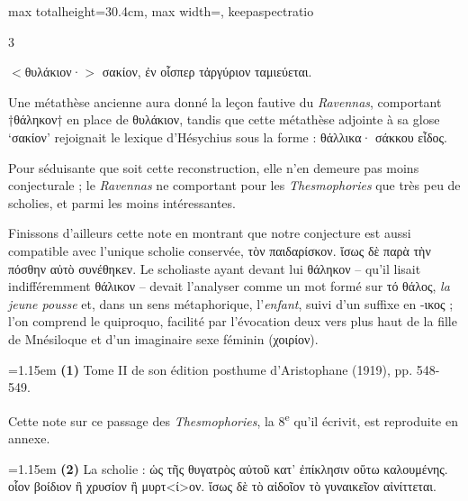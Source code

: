 \documentclass[11pt,twoside]{book}
\newcommand{\italique}[1]{\textit{#1}}
\newcommand{\citComm}[1]{\begin{quoting}[vskip=0.4pt,leftmargin=0.7em,rightmargin=0.2em]#1\end{quoting}}
\newcommand{\nieme}[1]{#1\textsuperscript{e}}
\begin{document}
\begin{adjustbox}{max totalheight=30.4cm, max width=\textwidth, keepaspectratio}
\begin{minipage}{\textwidth}
{\begin{multicols}{3}
\citComm{$<$θυλάκιον·$>$ σακίον, ἐν οἷσπερ τἀργύριον ταμιεύεται.}
\par\vspace{1.5pt}
\noindent Une métathèse ancienne aura donné la leçon fautive du \italique{Ravennas}, comportant †θάληκον† en place de θυλάκιον, tandis que cette métathèse adjointe à sa glose `σακίον' rejoignait le lexique d'Hésychius sous la forme : θάλλικα· σάκκου εἶδος.
\par\vspace{1.5pt}
\noindent Pour séduisante que soit cette reconstruction, elle n'en demeure pas moins conjecturale ; le \italique{Ravennas} ne comportant pour les \italique{Thesmophories} que très peu de scholies, et parmi les moins intéressantes.
\par\vspace{1.5pt}
\noindent Finissons d'ailleurs cette note en montrant que notre conjecture est aussi compatible avec l'unique scholie conservée, τὸν παιδαρίσκον. ἴσως δὲ παρὰ τὴν πόσθην αὐτὸ συνέθηκεν. Le scholiaste ayant devant lui θάληκον -- qu'il lisait indifféremment θάλικον -- devait l'analyser comme un mot formé sur τό θάλος, \italique{la jeune pousse} et, dans un sens métaphorique, l'\italique{enfant}, suivi d'un suffixe en -ικος ; l'on comprend le quiproquo, facilité par l'évocation deux vers plus haut de la fille de Mnésiloque et d'un imaginaire sexe féminin (χοιρίον).
\par\vspace{1.5pt}
\par\vspace{1.2pt}\par\nopagebreak\vspace{1pt}\noindent\hangindent=1.15em {\color{sepiaNote}\textbf{(1)}} Tome II de son édition posthume d'Aristophane (1919), pp. 548-549.
\par\vspace{1.5pt}
\noindent Cette note sur ce passage des \italique{Thesmophories}, la \nieme{8} qu'il écrivit, est reproduite en annexe.
\par\vspace{1.5pt}
\noindent\hangindent=1.15em {\color{sepiaNote}\textbf{(2)}} La scholie : ὡς τῆς θυγατρὸς αὐτοῦ κατ' ἐπίκλησιν οὕτω καλουμένης. οἷον βοίδιον ἢ χρυσίον ἢ μυρτ<ί>ον. ἴσως δὲ τὸ αἰδοῖον τὸ γυναικεῖον αἰνίττεται.
\par\vspace{1.5pt}

\end{multicols}}
\end{minipage}
\end{adjustbox}
\end{document}

